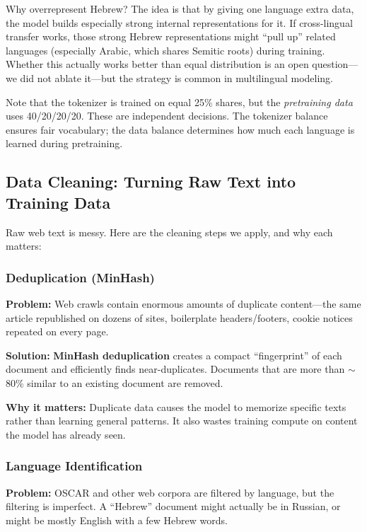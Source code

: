\documentclass[11pt,a4paper]{article}
\begin{document}
Why overrepresent Hebrew? The idea is that by giving one language extra data, the model builds especially strong internal representations for it. If cross-lingual transfer works, those strong Hebrew representations might ``pull up'' related languages (especially Arabic, which shares Semitic roots) during training. Whether this actually works better than equal distribution is an open question---we did not ablate it---but the strategy is common in multilingual modeling.

\begin{tip}
Note that the tokenizer is trained on equal 25\% shares, but the \emph{pretraining data} uses 40/20/20/20. These are independent decisions. The tokenizer balance ensures fair vocabulary; the data balance determines how much each language is learned during pretraining.
\end{tip}

\subsection{Data Cleaning: Turning Raw Text into Training Data}

Raw web text is messy. Here are the cleaning steps we apply, and why each matters:

\subsubsection{Deduplication (MinHash)}

\textbf{Problem:} Web crawls contain enormous amounts of duplicate content---the same article republished on dozens of sites, boilerplate headers/footers, cookie notices repeated on every page.

\textbf{Solution:} \textbf{MinHash deduplication} creates a compact ``fingerprint'' of each document and efficiently finds near-duplicates. Documents that are more than $\sim$80\% similar to an existing document are removed.

\textbf{Why it matters:} Duplicate data causes the model to memorize specific texts rather than learning general patterns. It also wastes training compute on content the model has already seen.

\subsubsection{Language Identification}

\textbf{Problem:} OSCAR and other web corpora are filtered by language, but the filtering is imperfect. A ``Hebrew'' document might actually be in Russian, or might be mostly English with a few Hebrew words.
\end{document}
